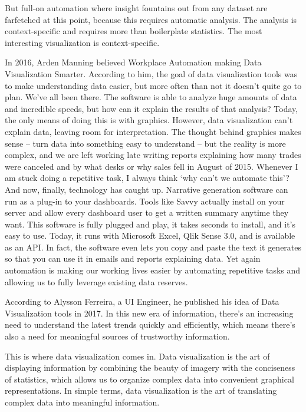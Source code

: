 \documentclass[]{book}
\theoremstyle{definition}
\theoremstyle{definition}
\theoremstyle{definition}
\theoremstyle{remark}
\begin{document}
But full-on automation where insight fountains out from any dataset are
farfetched at this point, because this requires automatic analysis. The
analysis is context-specific and requires more than boilerplate
statistics. The most interesting visualization is context-specific.

In 2016, Arden Manning believed Workplace Automation making Data
Visualization Smarter. According to him, the goal of data visualization
tools was to make understanding data easier, but more often than not it
doesn't quite go to plan. We've all been there. The software is able to
analyze huge amounts of data and incredible speeds, but how can it
explain the results of that analysis? Today, the only means of doing
this is with graphics. However, data visualization can't explain data,
leaving room for interpretation. The thought behind graphics makes sense
-- turn data into something easy to understand -- but the reality is
more complex, and we are left working late writing reports explaining
how many trades were canceled and by what desks or why sales fell in
August of 2015. Whenever I am stuck doing a repetitive task, I always
think `why can't we automate this'? And now, finally, technology has
caught up. Narrative generation software can run as a plug-in to your
dashboards. Tools like Savvy actually install on your server and allow
every dashboard user to get a written summary anytime they want. This
software is fully plugged and play, it takes seconds to install, and
it's easy to use. Today, it runs with Microsoft Excel, Qlik Sense 3.0,
and is available as an API. In fact, the software even lets you copy and
paste the text it generates so that you can use it in emails and reports
explaining data. Yet again automation is making our working lives easier
by automating repetitive tasks and allowing us to fully leverage
existing data reserves.

According to Alysson Ferreira, a UI Engineer, he published his idea of
Data Visualization tools in 2017. In this new era of information,
there's an increasing need to understand the latest trends quickly and
efficiently, which means there's also a need for meaningful sources of
trustworthy information.

This is where data visualization comes in. Data visualization is the art
of displaying information by combining the beauty of imagery with the
conciseness of statistics, which allows us to organize complex data into
convenient graphical representations. In simple terms, data
visualization is the art of translating complex data into meaningful
information.
\end{document}
